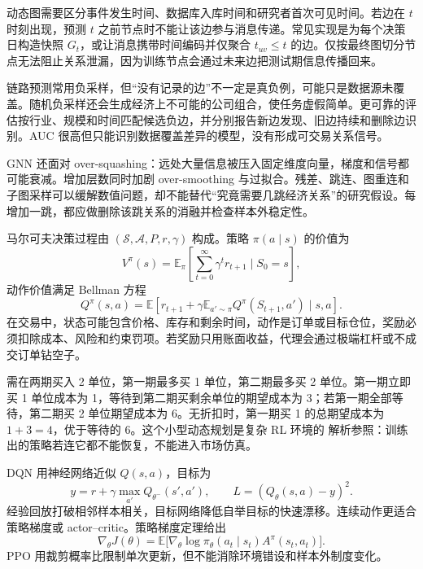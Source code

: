 动态图需要区分事件发生时间、数据库入库时间和研究者首次可见时间。若边在 $t$ 时刻出现，预测 $t$ 之前节点时不能让该边参与消息传递。常见实现是为每个决策日构造快照 $G_t$，或让消息携带时间编码并仅聚合 $t_{uv}\le t$ 的边。仅按最终图切分节点无法阻止关系泄漏，因为训练节点会通过未来边把测试期信息传播回来。

链路预测常用负采样，但“没有记录的边”不一定是真负例，可能只是数据源未覆盖。随机负采样还会生成经济上不可能的公司组合，使任务虚假简单。更可靠的评估按行业、规模和时间匹配候选负边，并分别报告新边发现、旧边持续和删除边识别。AUC 很高但只能识别数据覆盖差异的模型，没有形成可交易关系信号。

GNN 还面对 over-squashing：远处大量信息被压入固定维度向量，梯度和信号都可能衰减。增加层数同时加剧 over-smoothing 与过拟合。残差、跳连、图重连和子图采样可以缓解数值问题，却不能替代“究竟需要几跳经济关系”的研究假设。每增加一跳，都应做删除该跳关系的消融并检查样本外稳定性。


马尔可夫决策过程由 $(\mathcal S,\mathcal A,P,r,\gamma)$ 构成。策略 $\pi(a\mid s)$ 的价值为
\[
V^\pi(s)=\mathbb E_\pi\left[\sum_{t=0}^{\infty}
\gamma^t r_{t+1}\mid S_0=s\right],
\]
动作价值满足 Bellman 方程
\[
Q^\pi(s,a)=\mathbb E\left[r_{t+1}+\gamma
\mathbb E_{a'\sim\pi}Q^\pi(S_{t+1},a')\mid s,a\right].
\]
在交易中，状态可能包含价格、库存和剩余时间，动作是订单或目标仓位，奖励必须扣除成本、风险和约束罚项。若奖励只用账面收益，代理会通过极端杠杆或不成交订单钻空子。




需在两期买入 2 单位，第一期最多买 1 单位，第二期最多买 2 单位。第一期立即买 1 单位成本为 1，等待到第二期买剩余单位的期望成本为 3；若第一期全部等待，第二期买 2 单位期望成本为 6。无折扣时，第一期买 1 的总期望成本为 $1+3=4$，优于等待的 6。这个小型动态规划是复杂 RL 环境的 解析参照：训练出的策略若连它都不能恢复，不能进入市场仿真。


DQN 用神经网络近似 $Q(s,a)$，目标为
\[
y=r+\gamma\max_{a'}Q_{\theta^-}(s',a'),
\qquad L=(Q_\theta(s,a)-y)^2.
\]
经验回放打破相邻样本相关，目标网络降低自举目标的快速漂移。连续动作更适合策略梯度或 actor--critic。策略梯度定理给出
\[
\nabla_\theta J(\theta)=
\mathbb E\big[\nabla_\theta\log\pi_\theta(a_t\mid s_t)
A^\pi(s_t,a_t)\big].
\]
PPO 用裁剪概率比限制单次更新，但不能消除环境错设和样本外制度变化。

